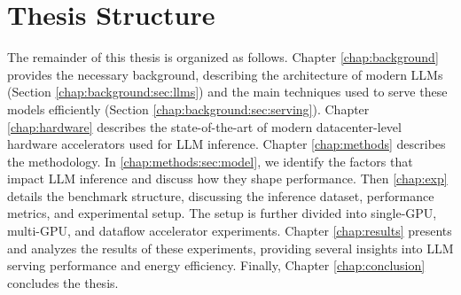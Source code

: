 \section{Thesis Structure}
\label{intro:struc}
The remainder of this thesis is organized as follows.
Chapter \ref{chap:background} provides the necessary background, describing the architecture of modern LLMs (Section \ref{chap:background:sec:llms}) and the main techniques used to serve these models efficiently (Section \ref{chap:background:sec:serving}).
Chapter \ref{chap:hardware} describes the state-of-the-art of modern datacenter-level hardware accelerators used for LLM inference.
Chapter \ref{chap:methods} describes the methodology. In \ref{chap:methods:sec:model}, we identify the factors that impact LLM inference and discuss how they shape performance. Then \ref{chap:exp} details the benchmark structure, discussing the inference dataset, performance metrics, and experimental setup. The setup is further divided into single-GPU, multi-GPU, and dataflow accelerator experiments.
Chapter \ref{chap:results} presents and analyzes the results of these experiments, providing several insights into LLM serving performance and energy efficiency.
Finally, Chapter \ref{chap:conclusion} concludes the thesis.
